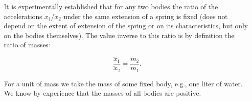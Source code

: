 It is experimentally established that for any two bodies the ratio of the accelerations $\ddot{x}_1/\ddot{x}_2$ under the same extension of a spring is fixed (does not depend on the extent of extension of the spring or on its characteristics, but only on the bodies themselves). The value inverse to this ratio is by definition the ratio of masses:

$$\frac{\ddot{x}_1}{\ddot{x}_2} = \frac{m_2}{m_1}.$$

For a unit of mass we take the mass of some fixed body, e.g., one liter of water. We know by experience that the masses of all bodies are positive.

